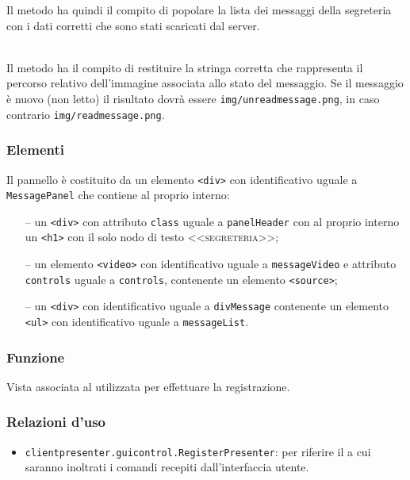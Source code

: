\begin{description}
  Il metodo ha quindi il compito di popolare la lista dei messaggi della segreteria con i dati corretti che sono stati scaricati dal server.
  
  \item{}\\
  Il metodo ha il compito di restituire la stringa corretta che rappresenta il percorso relativo dell'immagine associata allo stato del messaggio. Se il messaggio è nuovo (non letto) il risultato dovrà essere \verb'img/unreadmessage.png', in caso contrario  \verb'img/readmessage.png'.
  
\end{description}

\subsubsection*{Elementi}
Il pannello è costituito da un elemento \verb'<div>' con identificativo uguale a \verb'MessagePanel' che contiene al proprio interno:
\begin{itemize}
  \item[--] un \verb'<div>' con attributo \verb'class' uguale a \verb'panelHeader' con al proprio interno un \verb'<h1>' con il solo nodo di testo \textsc{<<segreteria>>};
  \item[--] un elemento \verb'<video>' con identificativo uguale a \verb'messageVideo' e attributo \verb'controls' uguale a \verb'controls', contenente un elemento \verb'<source>';
  \item[--] un \verb'<div>' con identificativo uguale a \verb'divMessage' contenente un elemento \verb'<ul>' con identificativo uguale a \verb'messageList'.
\end{itemize}


\subsubsection*{Funzione}
Vista associata al   utilizzata per effettuare la registrazione.

\subsubsection*{Relazioni d'uso}
\begin{itemize}
  \item \texttt{clientpresenter.guicontrol.RegisterPresenter}: per riferire il  a cui saranno inoltrati i comandi recepiti dall'interfaccia utente.
\end{itemize}

